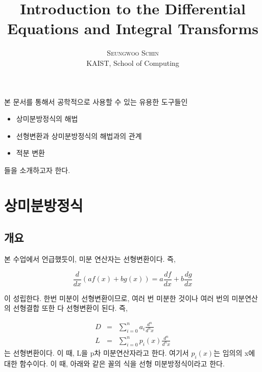 \documentclass[twoside]{article}
\title{\vspace{-15mm}\fontsize{24pt}{10pt}\selectfont\textbf{Introduction to the Differential Equations and Integral Transforms}} %
\author{
\large
\textsc{Seungwoo Schin}\\[2mm] %
\normalsize KAIST, School of Computing  \\ %
\vspace{-5mm}
}
\date{}
\begin{document}
\maketitle %

\thispagestyle{fancy} %



본 문서를 통해서 공학적으로 사용할 수 있는 유용한 도구들인 

\begin{itemize} 
\item 상미분방정식의 해법 
\item 선형변환과 상미분방정식의 해법과의 관계
\item 적분 변환
\end{itemize}

들을 소개하고자 한다. 

\section{상미분방정식} 

\subsection{개요} 

본 수업에서 언급했듯이, 미분 연산자는 선형변환이다. 즉, 

\begin{equation} 
\frac{d}{dx} (a f(x) + bg(x)) = a \frac{df}{dx} +  b \frac{dg}{dx}
\end{equation} 

이 성립한다. 한번 미분이 선형변환이므로, 여러 번 미분한 것이나 여러 번의 미분연산의 선형결합 또한 다 선형변환이 된다. 즉, 

\begin{eqnarray} 
D &=& \sum_{i=0}^n a_i \frac{d^n}{d^nx}  \\
L &=& \sum_{i=0}^n p_i(x) \frac{d^n}{d^nx} 
\end{eqnarray} 
는 선형변환이다. 이 때, L을 p차 미분연산자라고 한다. 여기서 $p_i(x)$는 임의의 x에 대한 함수이다. 이 때, 아래와 같은 꼴의 식을 선형 미분방정식이라고 한다. 
\end{document}
